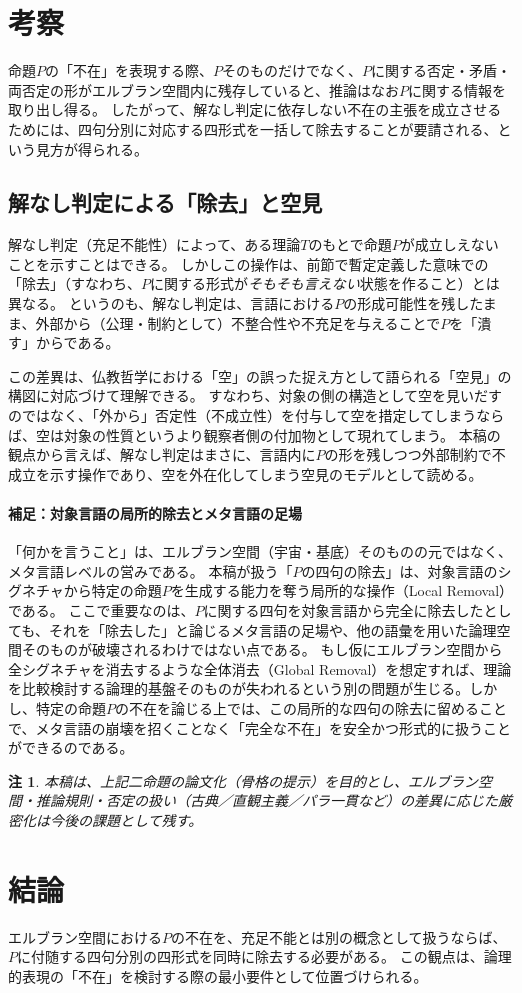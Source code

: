 \documentclass[a4paper,11pt]{article}
\newtheorem{remark}{注}
\begin{document}
\section{考察}
命題$P$の「不在」を表現する際、$P$そのものだけでなく、$P$に関する否定・矛盾・両否定の形がエルブラン空間内に残存していると、推論はなお$P$に関する情報を取り出し得る。
したがって、解なし判定に依存しない不在の主張を成立させるためには、四句分別に対応する四形式を一括して除去することが要請される、という見方が得られる。

\subsection{解なし判定による「除去」と空見}
解なし判定（充足不能性）によって、ある理論$T$のもとで命題$P$が成立しえないことを示すことはできる。
しかしこの操作は、前節で暫定定義した意味での「除去」（すなわち、$P$に関する形式が\emph{そもそも言えない}状態を作ること）とは異なる。
というのも、解なし判定は、言語における$P$の形成可能性を残したまま、外部から（公理・制約として）不整合性や不充足を与えることで$P$を「潰す」からである。

この差異は、仏教哲学における「空」の誤った捉え方として語られる「空見」の構図に対応づけて理解できる。
すなわち、対象の側の構造として空を見いだすのではなく、「外から」否定性（不成立性）を付与して空を措定してしまうならば、空は対象の性質というより観察者側の付加物として現れてしまう。
本稿の観点から言えば、解なし判定はまさに、言語内に$P$の形を残しつつ外部制約で不成立を示す操作であり、空を外在化してしまう空見のモデルとして読める。

\paragraph{補足：対象言語の局所的除去とメタ言語の足場}
「何かを言うこと」は、エルブラン空間（宇宙・基底）そのものの元ではなく、メタ言語レベルの営みである。
本稿が扱う「$P$の四句の除去」は、対象言語のシグネチャから特定の命題$P$を生成する能力を奪う局所的な操作（Local Removal）である。
ここで重要なのは、$P$に関する四句を対象言語から完全に除去したとしても、それを「除去した」と論じるメタ言語の足場や、他の語彙を用いた論理空間そのものが破壊されるわけではない点である。
もし仮にエルブラン空間から全シグネチャを消去するような全体消去（Global Removal）を想定すれば、理論を比較検討する論理的基盤そのものが失われるという別の問題が生じる。しかし、特定の命題$P$の不在を論じる上では、この局所的な四句の除去に留めることで、メタ言語の崩壊を招くことなく「完全な不在」を安全かつ形式的に扱うことができるのである。

\begin{remark}
本稿は、上記二命題の論文化（骨格の提示）を目的とし、エルブラン空間・推論規則・否定の扱い（古典／直観主義／パラ一貫など）の差異に応じた厳密化は今後の課題として残す。
\end{remark}

\section{結論}
エルブラン空間における$P$の不在を、充足不能とは別の概念として扱うならば、$P$に付随する四句分別の四形式を同時に除去する必要がある。
この観点は、論理的表現の「不在」を検討する際の最小要件として位置づけられる。
\end{document}
